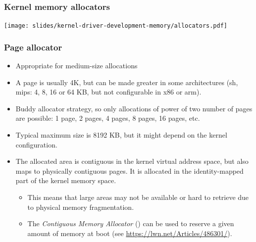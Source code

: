 \begin{frame}
  \frametitle{Kernel memory allocators}
  \begin{center}
    \texttt{[image: slides/kernel-driver-development-memory/allocators.pdf]}
  \end{center}
\end{frame}

\begin{frame}[fragile]
  \frametitle{Page allocator}
  \begin{itemize}
  \item Appropriate for medium-size allocations
  \item A page is usually 4K, but can be made greater in some
    architectures (sh, mips: 4, 8, 16 or 64 KB, but not configurable in
    x86 or arm).
  \item Buddy allocator strategy, so only allocations of power of two
    number of pages are possible: 1 page, 2 pages, 4 pages, 8 pages,
    16 pages, etc.
  \item Typical maximum size is 8192 KB, but it might depend on the
    kernel configuration.
  \item The allocated area is contiguous in the kernel virtual address
    space, but also maps to physically contiguous pages. It is
    allocated in the identity-mapped part of the kernel memory space.
    \begin{itemize}
    \item This means that large areas may not be available or hard to
      retrieve due to physical memory fragmentation.
    \item The {\em Contiguous Memory Allocator} () can be used
      to reserve a given amount of memory at boot (see
      \url{https://lwn.net/Articles/486301/}).
    \end{itemize}
  \end{itemize}
\end{frame}

